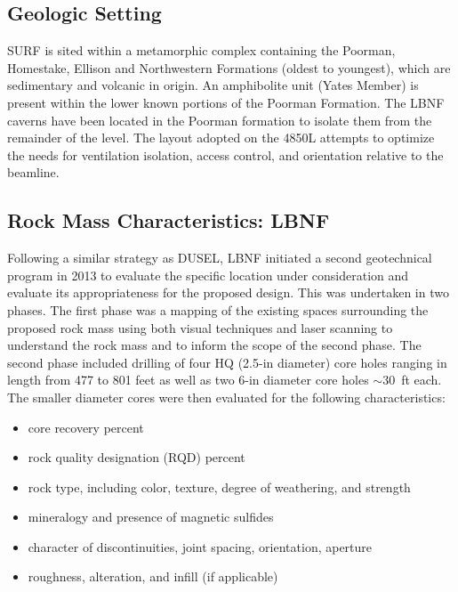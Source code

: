 \subsection{Geologic Setting}
\label{sec:fscf-site-cond-geo-set}

SURF is sited within a metamorphic complex containing the Poorman, Homestake, Ellison and Northwestern Formations (oldest to youngest), which are sedimentary and volcanic in origin. An amphibolite unit (Yates Member) is present within the lower known portions of the Poorman Formation. The LBNF %
caverns have been located in the Poorman formation to isolate them from the remainder of the level. The layout adopted on the 4850L attempts to optimize the needs for ventilation isolation, access control, and orientation relative to the beamline.

\subsection{Rock Mass Characteristics: LBNF}
\label{sec:fscf-site-cond-geo-rock}

Following a similar strategy as DUSEL, LBNF initiated a second geotechnical program in 2013 to evaluate the specific location under consideration and evaluate its appropriateness for the proposed design.  This was undertaken in two phases.  The first phase was a mapping of the existing spaces surrounding the proposed rock mass using both visual techniques and laser scanning to understand the rock mass and to inform the scope of the second phase.  The second phase included drilling of four HQ (2.5-in diameter) core holes ranging in length from 477 to 801 feet as well as two 6-in diameter core holes $\sim$30~ft each.  The smaller diameter cores were then evaluated for the following characteristics:

\begin{itemize}
 \item core recovery percent
 \item rock quality designation (RQD) percent
 \item rock type, including color, texture, degree of weathering, and strength
 \item mineralogy and presence of magnetic sulfides
 \item character of discontinuities, joint spacing, orientation, aperture
 \item roughness, alteration, and infill (if applicable)
\end{itemize}

